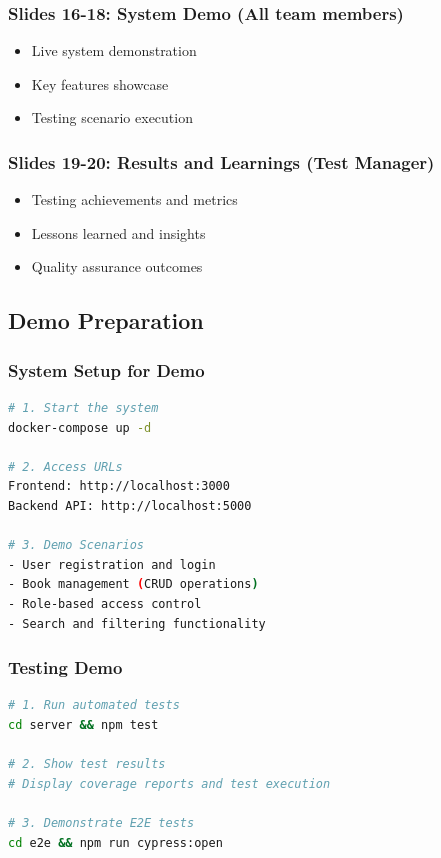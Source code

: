 \documentclass[12pt,a4paper]{article}
\begin{document}
\subsubsection{Slides 16-18: System Demo (All team members)}
\begin{itemize}[leftmargin=*]
    \item Live system demonstration
    \item Key features showcase
    \item Testing scenario execution
\end{itemize}

\subsubsection{Slides 19-20: Results and Learnings (Test Manager)}
\begin{itemize}[leftmargin=*]
    \item Testing achievements and metrics
    \item Lessons learned and insights
    \item Quality assurance outcomes
\end{itemize}

\subsection{Demo Preparation}

\subsubsection{System Setup for Demo}
\begin{lstlisting}[language=bash]
# 1. Start the system
docker-compose up -d

# 2. Access URLs
Frontend: http://localhost:3000
Backend API: http://localhost:5000

# 3. Demo Scenarios
- User registration and login
- Book management (CRUD operations)
- Role-based access control
- Search and filtering functionality
\end{lstlisting}

\subsubsection{Testing Demo}
\begin{lstlisting}[language=bash]
# 1. Run automated tests
cd server && npm test

# 2. Show test results
# Display coverage reports and test execution

# 3. Demonstrate E2E tests
cd e2e && npm run cypress:open
\end{lstlisting}
\end{document}
